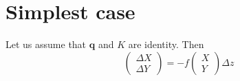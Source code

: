 \documentclass{article}
\def\q{\mathbf{q}}
\begin{document}
\section{Simplest case}

Let us assume that $\q$ and $K$ are identity.  Then
\begin{equation}
   \begin{pmatrix} \Delta X \\ \Delta Y \end{pmatrix} =
-f \begin{pmatrix} X \\ Y \end{pmatrix} \Delta z
\end{equation}
\end{document}
